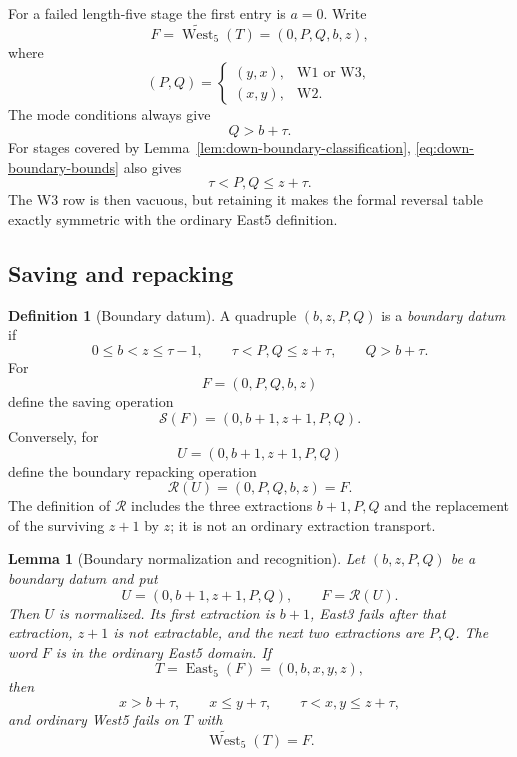 \documentclass[11pt]{article}
\newtheorem{lemma}[theorem]{Lemma}
\theoremstyle{definition}
\newtheorem{definition}[theorem]{Definition}
\theoremstyle{remark}
\newcommand{\East}{\operatorname{East}}
\newcommand{\West}{\operatorname{West}}
\newcommand{\Save}{\mathcal S}
\newcommand{\Repack}{\mathcal R}
\begin{document}
For a failed length-five stage the first entry is $a=0$.  Write
\[
 F=\widetilde{\West}_5(T)=(0,P,Q,b,z),
\]
where
\begin{equation}
 (P,Q)=
 \begin{cases}
  (y,x),&\mathrm{W1}\text{ or }\mathrm{W3},\\
  (x,y),&\mathrm{W2}.
 \end{cases}
 \label{eq:PQ-modes}
\end{equation}
The mode conditions always give
\begin{equation}
 Q>b+\tau.
 \label{eq:boundary-east3-fail}
\end{equation}
For stages covered by Lemma~\ref{lem:down-boundary-classification},
\eqref{eq:down-boundary-bounds} also gives
\[
 \tau<P,Q\le z+\tau.
\]
The W3 row is then vacuous, but retaining it makes the formal reversal table
exactly symmetric with the ordinary East5 definition.

\subsection{Saving and repacking}

\begin{definition}[Boundary datum]
\label{def:boundary-datum}
A quadruple $(b,z,P,Q)$ is a \emph{boundary datum} if
\[
 0\le b<z\le\tau-1,
 \qquad
 \tau<P,Q\le z+\tau,
 \qquad
 Q>b+\tau.
\]
For
\[
 F=(0,P,Q,b,z)
\]
define the saving operation
\begin{equation}
 \Save(F)=(0,b+1,z+1,P,Q).
 \label{eq:saving}
\end{equation}
Conversely, for
\[
 U=(0,b+1,z+1,P,Q)
\]
define the boundary repacking operation
\begin{equation}
 \Repack(U)=(0,P,Q,b,z)=F.
 \label{eq:repacking}
\end{equation}
The definition of $\Repack$ includes the three extractions
$b+1,P,Q$ and the replacement of the surviving $z+1$ by $z$; it is not an
ordinary extraction transport.
\end{definition}

\begin{lemma}[Boundary normalization and recognition]
\label{lem:boundary-recognition}
Let $(b,z,P,Q)$ be a boundary datum and put
\[
 U=(0,b+1,z+1,P,Q),
 \qquad F=\Repack(U).
\]
Then $U$ is normalized.  Its first extraction is $b+1$, East3 fails after
that extraction, $z+1$ is not extractable, and the next two extractions are
$P,Q$.  The word $F$ is in the ordinary East5 domain.  If
\[
 T=\East_5(F)=(0,b,x,y,z),
\]
then
\[
 x>b+\tau,
 \qquad x\le y+\tau,
 \qquad \tau<x,y\le z+\tau,
\]
and ordinary West5 fails on $T$ with
\[
 \widetilde{\West}_5(T)=F.
\]
\end{lemma}
\end{document}
